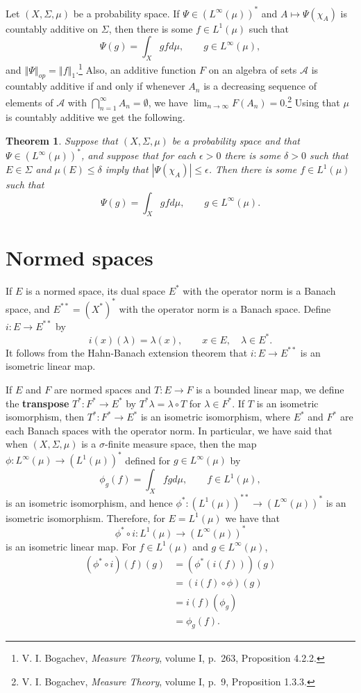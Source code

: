 \documentclass{article}
\newcommand{\norm}[1]{\left\Vert #1 \right\Vert}
\newtheorem{theorem}{Theorem}
\theoremstyle{definition}
\begin{document}
Let $(X,\Sigma,\mu)$ be a probability space. If $\Psi \in (L^\infty(\mu))^*$ and $A \mapsto \Psi(\chi_A)$ is countably
additive on $\Sigma$, then there is some $f \in L^1(\mu)$ such that
\[
\Psi(g) = \int_X g f d\mu, \qquad g \in L^\infty(\mu),
\]
and $\norm{\Psi}_{op} = \norm{f}_1$.\footnote{V. I. Bogachev, {\em Measure Theory}, volume I,
p.~263, Proposition 4.2.2.}
Also, an additive  function $F$ on an algebra of sets $\mathscr{A}$ is countably additive
if and only if whenever $A_n$ is a decreasing sequence of elements of $\mathscr{A}$ with
$\bigcap_{n=1}^\infty A_n = \emptyset$, we have $\lim_{n\to \infty} F(A_n) = 0$.\footnote{V. I. Bogachev, {\em Measure Theory}, volume I,
p.~9, Proposition 1.3.3.} 
Using that $\mu$ is countably additive we get the following.

\begin{theorem}
Suppose that $(X,\Sigma,\mu)$ be a probability space and that $\Psi \in (L^\infty(\mu))^*$, and suppose that
 for each $\epsilon>0$ there
is some $\delta>0$ such that $E \in \Sigma$ and $\mu(E) \leq \delta$ imply that
$|\Psi(\chi_A)| \leq \epsilon$.
Then there is some $f \in L^1(\mu)$ such that
\[
\Psi(g) = \int_X gf d\mu, \qquad g \in L^\infty(\mu).
\]
\label{Linfinity}
\end{theorem}


\section{Normed spaces}
If $E$ is a normed space, its dual space $E^*$ with the operator norm is a Banach space, and  $E^{**}=(X^*)^*$ with the operator
norm is a Banach space. Define $i:E \to E^{**}$ by
\[
i(x)(\lambda)=\lambda(x), \qquad x \in E, \quad \lambda \in E^*.
\]
It follows from the Hahn-Banach extension theorem that $i:E \to E^{**}$ is an isometric linear map. 

If $E$ and $F$ are normed spaces and $T:E \to F$ is a bounded linear map, we define the \textbf{transpose} $T^*:F^* \to E^*$ by
$T^* \lambda = \lambda \circ T$ for $\lambda \in F^*$. If $T$ is an isometric isomorphism, then $T^*:F^* \to E^*$ is an isometric isomorphism, where
$E^*$ and $F^*$ are each Banach spaces with the operator norm. In particular, we have said that when $(X,\Sigma,\mu)$ is a 
$\sigma$-finite measure space, then the map $\phi:L^\infty(\mu) \to (L^1(\mu))^*$ defined for $g \in L^\infty(\mu)$ by
\[
\phi_g(f) = \int_X fg d\mu, \qquad f \in L^1(\mu),
\]
is an isometric isomorphism, and hence $\phi^*:(L^1(\mu))^{**} \to (L^\infty(\mu))^*$ is an isometric isomorphism.
Therefore, for $E=L^1(\mu)$ we have that
\begin{equation}
\phi^* \circ i:L^1(\mu) \to (L^\infty(\mu))^*
\label{isometric}
\end{equation}
is an isometric linear map. For $f \in L^1(\mu)$ and $g \in L^\infty(\mu)$,
\begin{align*}
(\phi^* \circ i)(f)(g)&=(\phi^*(i(f)))(g)\\
&=(i(f) \circ \phi)(g)\\
&=i(f)(\phi_g)\\
&=\phi_g(f).
\end{align*}
\end{document}
